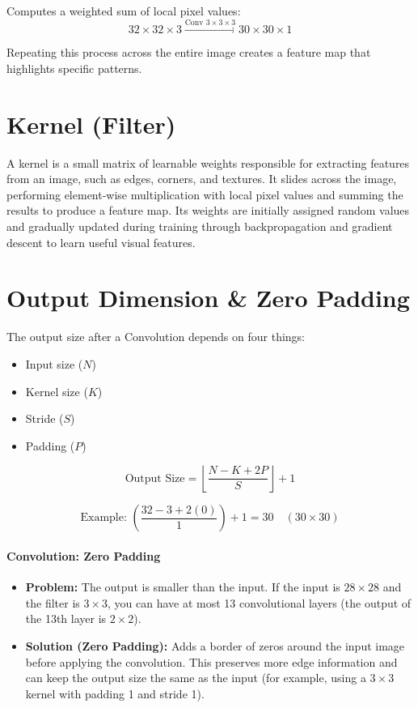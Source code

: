 Computes a weighted sum of local pixel values:
\begin{equation}
32 \times 32 \times 3 \xrightarrow{\text{Conv } 3 \times 3 \times 3} 30 \times 30 \times 1
\end{equation}

Repeating this process across the entire image creates a feature map that highlights specific patterns.

\section{Kernel (Filter)}

A kernel is a small matrix of learnable weights responsible for extracting features from an image, such as edges, corners, and textures. It slides across the image, performing element-wise multiplication with local pixel values and summing the results to produce a feature map. Its weights are initially assigned random values and gradually updated during training through backpropagation and gradient descent to learn useful visual features.

\section{Output Dimension \& Zero Padding}

The output size after a Convolution depends on four things:
\begin{itemize}
    \item Input size ($N$)
    \item Kernel size ($K$)
    \item Stride ($S$)
    \item Padding ($P$)
\end{itemize}

\begin{equation}
\text{Output Size} = \left\lfloor \frac{N - K + 2P}{S} \right\rfloor + 1
\end{equation}

\begin{equation}
\text{Example: } \left( \frac{32 - 3 + 2(0)}{1} \right) + 1 = 30 \quad (30 \times 30)
\end{equation}

\paragraph{Convolution: Zero Padding}
\begin{itemize}
    \item \textbf{Problem:} The output is smaller than the input. If the input is $28 \times 28$ and the filter is $3 \times 3$, you can have at most 13 convolutional layers (the output of the 13th layer is $2 \times 2$).
    \item \textbf{Solution (Zero Padding):} Adds a border of zeros around the input image before applying the convolution. This preserves more edge information and can keep the output size the same as the input (for example, using a $3 \times 3$ kernel with padding 1 and stride 1).
\end{itemize}

